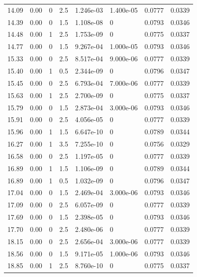 \documentclass[preview]{standalone}
\begin{document}
{{{\begin{tabular}{L{1.2cm}C{1.2cm} C{0.3cm}C{0.5cm} C{1.4cm}C{1.4cm} C{1.4cm}C{1.4cm}}
  14.09  &  0.00  & 0     & 2.5 &  1.246e-03  & 1.400e-05  & 0.0777 &  0.0339   \\ 
  14.39  &  0.00  & 0     & 1.5 &  1.108e-08  & 0  & 0.0793 &  0.0346   \\ 
  14.48  &  0.00  & 1     & 2.5 &  1.753e-09  & 0  & 0.0775 &  0.0337   \\ 
  14.77  &  0.00  & 0     & 1.5 &  9.267e-04  & 1.000e-05  & 0.0793 &  0.0346   \\ 
  15.33  &  0.00  & 0     & 2.5 &  8.517e-04  & 9.000e-06  & 0.0777 &  0.0339   \\ 
  15.40  &  0.00  & 1     & 0.5 &  2.344e-09  & 0  & 0.0796 &  0.0347   \\ 
  15.45  &  0.00  & 0     & 2.5 &  6.793e-04  & 7.000e-06  & 0.0777 &  0.0339   \\ 
  15.63  &  0.00  & 1     & 2.5 &  2.700e-09  & 0  & 0.0775 &  0.0337   \\ 
  15.79  &  0.00  & 0     & 1.5 &  2.873e-04  & 3.000e-06  & 0.0793 &  0.0346   \\ 
  15.91  &  0.00  & 0     & 2.5 &  4.056e-05  & 0  & 0.0777 &  0.0339   \\ 
  15.96  &  0.00  & 1     & 1.5 &  6.647e-10  & 0  & 0.0789 &  0.0344   \\ 
  16.27  &  0.00  & 1     & 3.5 &  7.255e-10  & 0  & 0.0756 &  0.0329   \\ 
  16.58  &  0.00  & 0     & 2.5 &  1.197e-05  & 0  & 0.0777 &  0.0339   \\ 
  16.89  &  0.00  & 1     & 1.5 &  1.106e-09  & 0  & 0.0789 &  0.0344   \\ 
  16.89  &  0.00  & 1     & 0.5 &  1.032e-09  & 0  & 0.0796 &  0.0347   \\ 
  17.04  &  0.00  & 0     & 1.5 &  2.469e-04  & 3.000e-06  & 0.0793 &  0.0346   \\ 
  17.09  &  0.00  & 0     & 2.5 &  6.057e-09  & 0  & 0.0777 &  0.0339   \\ 
  17.69  &  0.00  & 0     & 1.5 &  2.398e-05  & 0  & 0.0793 &  0.0346   \\ 
  17.70  &  0.00  & 0     & 2.5 &  2.480e-06  & 0  & 0.0777 &  0.0339   \\ 
  18.15  &  0.00  & 0     & 2.5 &  2.656e-04  & 3.000e-06  & 0.0777 &  0.0339   \\ 
  18.56  &  0.00  & 0     & 1.5 &  9.171e-05  & 1.000e-06  & 0.0793 &  0.0346   \\ 
  18.85  &  0.00  & 1     & 2.5 &  8.760e-10  & 0  & 0.0775 &  0.0337   \\ 

\end{tabular}}}}
\end{document}
